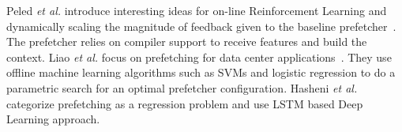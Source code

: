 Peled \textit{et al.} introduce interesting ideas for on-line
Reinforcement Learning and dynamically scaling the magnitude of
feedback given to the baseline prefetcher~\cite{Semantics}. The
prefetcher relies on compiler support to receive features and build
the context.  Liao \textit{et al.}  focus on prefetching for data
center applications~\cite{Datacenter}.  They use offline machine
learning algorithms such as SVMs and logistic regression to do a
parametric search for an optimal prefetcher configuration. 
Hasheni \textit{et al.}~\cite{LSTM} categorize 
prefetching as a regression problem and use LSTM based Deep 
Learning approach.
